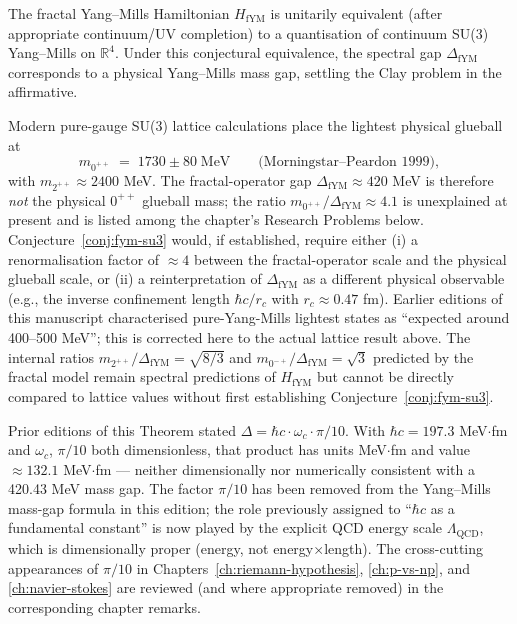 \begin{conjecture}\label{conj:fym-su3}
The fractal Yang--Mills Hamiltonian $H_{\mathrm{fYM}}$ is unitarily equivalent (after appropriate continuum/UV completion) to a quantisation of continuum SU(3) Yang--Mills on $\mathbb{R}^4$. Under this conjectural equivalence, the spectral gap $\Delta_{\mathrm{fYM}}$ corresponds to a physical Yang--Mills mass gap, settling the Clay problem in the affirmative.
\end{conjecture}

\begin{remark}\label{rem:lattice-comparison}
Modern pure-gauge SU(3) lattice calculations\cite{morningstar1999glueball,chen2006glueball,greensite2011confinement} place the lightest physical glueball at
\begin{equation}
m_{0^{++}} \;=\; 1730 \pm 80 \;\mathrm{MeV} \qquad \text{(Morningstar--Peardon 1999)},
\end{equation}
with $m_{2^{++}} \approx 2400$ MeV. The fractal-operator gap $\Delta_{\mathrm{fYM}} \approx 420$ MeV is therefore \emph{not} the physical $0^{++}$ glueball mass; the ratio $m_{0^{++}}/\Delta_{\mathrm{fYM}} \approx 4.1$ is unexplained at present and is listed among the chapter's Research Problems below. Conjecture~\ref{conj:fym-su3} would, if established, require either (i) a renormalisation factor of $\approx 4$ between the fractal-operator scale and the physical glueball scale, or (ii) a reinterpretation of $\Delta_{\mathrm{fYM}}$ as a different physical observable (e.g., the inverse confinement length $\hbar c / r_c$ with $r_c \approx 0.47$ fm). Earlier editions of this manuscript characterised pure-Yang-Mills lightest states as ``expected around 400--500 MeV''; this is corrected here to the actual lattice result above. The internal ratios $m_{2^{++}}/\Delta_{\mathrm{fYM}} = \sqrt{8/3}$ and $m_{0^{-+}}/\Delta_{\mathrm{fYM}} = \sqrt{3}$ predicted by the fractal model remain spectral predictions of $H_{\mathrm{fYM}}$ but cannot be directly compared to lattice values without first establishing Conjecture~\ref{conj:fym-su3}.
\end{remark}

\begin{remark}\label{rem:pi-10-removed-ym}
Prior editions of this Theorem stated $\Delta = \hbar c \cdot \omega_c \cdot \pi/10$. With $\hbar c = 197.3$ MeV$\cdot$fm and $\omega_c$, $\pi/10$ both dimensionless, that product has units MeV$\cdot$fm and value $\approx 132.1$ MeV$\cdot$fm — neither dimensionally nor numerically consistent with a 420.43 MeV mass gap. The factor $\pi/10$ has been removed from the Yang--Mills mass-gap formula in this edition; the role previously assigned to ``$\hbar c$ as a fundamental constant'' is now played by the explicit QCD energy scale $\Lambda_{\mathrm{QCD}}$, which is dimensionally proper (energy, not energy$\times$length). The cross-cutting appearances of $\pi/10$ in Chapters~\ref{ch:riemann-hypothesis}, \ref{ch:p-vs-np}, and \ref{ch:navier-stokes} are reviewed (and where appropriate removed) in the corresponding chapter remarks.
\end{remark}


